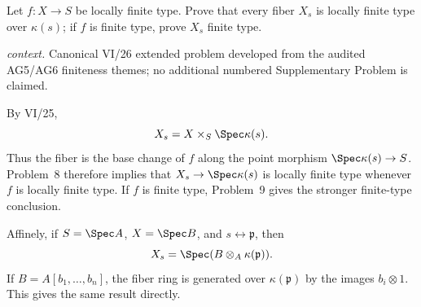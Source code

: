 \begin{problem}\label{prob:vi26-p15}
Let \(f:X\to S\) be locally finite type.  Prove that every fiber \(X_s\) is locally finite type over \(\kappa(s)\); if \(f\) is finite type, prove \(X_s\) finite type.
\par\smallskip\noindent\textit{context.} Canonical VI/26 extended problem developed from the audited AG5/AG6 finiteness themes; no additional numbered Supplementary Problem is claimed.
\end{problem}

\ifdefined\FullProblemDossiers
\begin{solution}
By VI/25,
\[
X_s=X\times_S\Spec\kappa(s).
\]
Thus the fiber is the base change of \(f\) along the point morphism
\(\Spec\kappa(s)\to S\).  Problem~8 therefore implies that \(X_s\to\Spec\kappa(s)\) is locally
finite type whenever \(f\) is locally finite type.  If \(f\) is finite type, Problem~9 gives the
stronger finite-type conclusion.

Affinely, if \(S=\Spec A\), \(X=\Spec B\), and \(s\leftrightarrow\mathfrak p\), then
\[
X_s=\Spec(B\otimes_A\kappa(\mathfrak p)).
\]
If \(B=A[b_1,\ldots,b_n]\), the fiber ring is generated over \(\kappa(\mathfrak p)\) by the images
\(b_i\otimes1\).  This gives the same result directly.
\end{solution}
\fi
